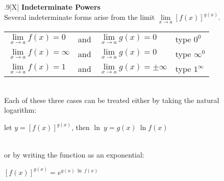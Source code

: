 \documentclass{article}
\begin{document}
\begin{center}
\large
\def\arraystretch{1.3}
{\setlength{\tabcolsep}{16pt}
\begin{tabularx}{.9\textwidth}{|X|}
\hline
	\vspace{1pt}
	\textbf{Indeterminate Powers} \: \\\vspace{1pt}
	Several indeterminate forms arise from the limit $\underset{x \to a}{\lim} [f(x)]^{g(x)}$. \\
	{\begin{tabular}{l l l l}
	$\underset{x \to a}{\lim} f(x)=0$  & and &  $\underset{x \to a}{\lim} g(x)=0$ & \hspace{32pt} type $0^0$ \\
	$\underset{x \to a}{\lim} f(x)=\infty$  & and &  $\underset{x \to a}{\lim} g(x)=0$ & \hspace{32pt} type $\infty^0$ \\
	$\underset{x \to a}{\lim} f(x)=1$ & and & $\underset{x \to a}{\lim} g(x)=\pm\infty$ & \hspace{32pt} type $1^\infty$ \\
	\end{tabular}}
	\\
	\vspace{1pt}
	Each of these three cases can be treated either by taking the natural \\ logarithm: 
	\begin{center}
	let \hspace{12pt} $y=[f(x)]^{g(x)}$, \hspace{12pt} then \hspace{12pt} $\ln \> y = g(x) \> \ln f(x)$ \\
	\end{center} \\
	or by writing the function as an exponential:
	\begin{center}
	$[f(x)]^{g(x)} = e^{g(x) \> \ln \> f(x)}$ \\
	\end{center} \\
	\hline
\end{tabularx}}
\end{center}
\vspace{24pt}
\end{document}

